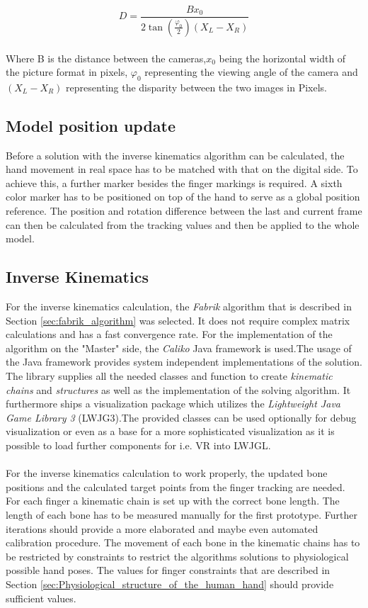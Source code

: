 \begin{equation}
D=\frac{Bx_0}{2\tan(\frac{\varphi_0}{2})(X_{L}-X_{R})}
\end{equation}\\
Where B is the distance between the cameras,$x_0$ being the horizontal width of the picture format in pixels, $\varphi_0$ representing the viewing angle of the camera and $(X_{L}-X_{R})$ representing the disparity between the two images in Pixels.
\subsection{Model position update}
Before a solution with the inverse kinematics algorithm can be calculated, the hand movement in real space has to be matched with that on the digital side. To achieve this, a further marker besides the finger markings is required. A sixth color marker has to be positioned on top of the hand to serve as a global position reference. The position and rotation difference between the last and current frame can then be calculated from the tracking values and then be applied to the whole model.
\subsection{Inverse Kinematics}
For the inverse kinematics calculation, the \textit{Fabrik} algorithm that is described in Section \ref{sec:fabrik_algorithm} was selected. It does not require complex matrix calculations and has a fast convergence rate. For the implementation of the algorithm on the "Master" side, the \textit{Caliko} Java framework\cite{Lansley.2016} is used.The usage of the Java framework provides system independent implementations of the solution. The library supplies all the needed classes and function to create \textit{kinematic chains} and \textit{structures} as well as the implementation of the solving algorithm. It furthermore ships a visualization package which utilizes the \textit{Lightweight Java Game Library 3} (LWJG3).The provided classes can be used optionally for debug visualization or even as a base for a more sophisticated visualization as it is possible to load further components for i.e. VR into LWJGL.\\\\
For the inverse kinematics calculation to work properly, the updated bone positions and the calculated target points from the finger tracking are needed.
For each finger a kinematic chain is set up with the correct bone length. The length of each bone has to be measured manually for the first prototype. Further iterations should provide a more elaborated and maybe even automated calibration procedure. The movement of each bone in the kinematic chains has to be restricted by constraints to restrict the algorithms solutions to physiological possible hand poses. The values for finger constraints that are described in Section \ref{sec:Physiological_structure_of_the_human_hand} should provide sufficient values. 